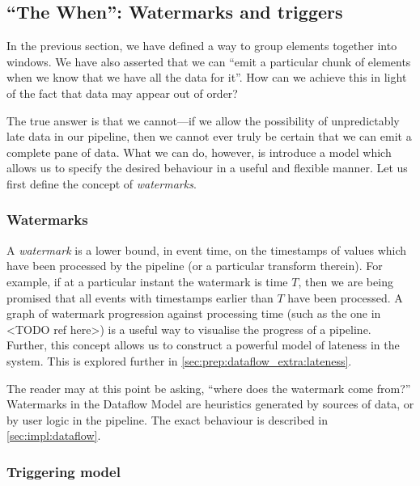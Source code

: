 

\subsection{``The When'': Watermarks and triggers}\label{sec:prep:dataflow:when}

In the previous section, we have defined a way to group elements together into windows.
We have also asserted that we can ``emit a particular chunk of elements when we know that we have all the data for it''.
How can we achieve this in light of the fact that data may appear out of order?

The true answer is that we cannot---if we allow the possibility of unpredictably late data in our pipeline, then we cannot ever truly be certain that we can emit a complete pane of data.
What we can do, however, is introduce a model which allows us to specify the desired behaviour in a useful and flexible manner.
Let us first define the concept of \emph{watermarks}.

\subsubsection{Watermarks}

A \emph{watermark} is a lower bound, in event time, on the timestamps of values which have been processed by the pipeline (or a particular transform therein).
For example, if at a particular instant the watermark is time $T$, then we are being promised that all events with timestamps earlier than $T$ have been processed.
A graph of watermark progression against processing time (such as the one in <TODO ref here>) is a useful way to visualise the progress of a pipeline.
Further, this concept allows us to construct a powerful model of lateness in the system.
This is explored further in \cref{sec:prep:dataflow_extra:lateness}.


The reader may at this point be asking, ``where does the watermark come from?''
Watermarks in the Dataflow Model are heuristics generated by sources of data, or by user logic in the pipeline.
The exact behaviour is described in \cref{sec:impl:dataflow}.

\subsubsection{Triggering model}

